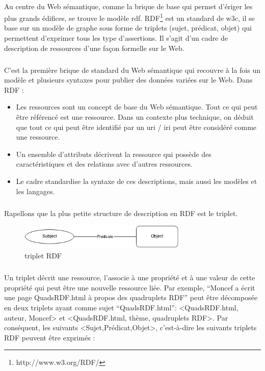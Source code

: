 \documentclass[12pt,a4]{report}
\begin{document}
\paragraph{}
Au centre du Web sémantique, comme la brique de base qui permet d’ériger les plus grands édifices, se trouve le modèle \gls{rdf}. RDF\footnote{http://www.w3.org/RDF/} est un standard de \gls{w3c}, il se base sur un modèle de graphe sous forme de triplets (sujet, prédicat, objet) qui permettent d'exprimer tous les type d'assertions. Il s’agit d’un cadre de description de ressources d’une façon formelle sur le Web.
\subparagraph{}
C’est la première brique de standard du Web sémantique qui recouvre à la fois un modèle et plusieurs syntaxes pour publier des données variées sur le Web.
\newline
Dans RDF :
\newline
\begin{itemize}
\item Les ressources sont un concept de base du Web sémantique. Tout ce qui peut être référencé est une ressource. Dans un contexte plus technique, on déduit que tout ce qui peut être identifié par un \gls{uri} / \gls{iri} peut être considéré comme une ressource.
\item Un ensemble d’attributs décrivent la ressource qui possède des caractéristiques et des relations avec d’autres ressources.
\item Le cadre standardise la syntaxe de ces descriptions, mais aussi les modèles et les langages.
\end{itemize}
\subparagraph{}
Rapellons que la plus petite structure de description en RDF est le triplet.
\begin{figure}[H]
\centering
\includegraphics[width=8cm]{tripletrdf.png}
\caption{triplet RDF}
\end{figure}
\subparagraph{}
Un triplet décrit une ressource, l’associe à une propriété et à une valeur de cette propriété qui peut être une nouvelle ressource liée. 
\newline
Par exemple, ``Moncef a écrit une page QuadsRDF.html à propos des quadruplets RDF” peut être décomposée en deux triplets ayant comme sujet ``QuadsRDF.html”: <QuadsRDF.html, auteur, Moncef> et <QuadsRDF.html, thème, quadruplets RDF>.
\newline
Par conséquent, les suivants <Sujet,Prédicat,Objet>, c'est-à-dire les suivants triplets RDF peuvent être exprimés :
\end{document}
